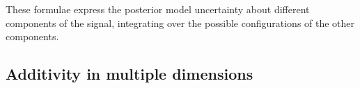 
These formulae express the posterior model uncertainty about different components of the signal, integrating over the possible configurations of the other components.



\subsection{Additivity in multiple dimensions}
  

